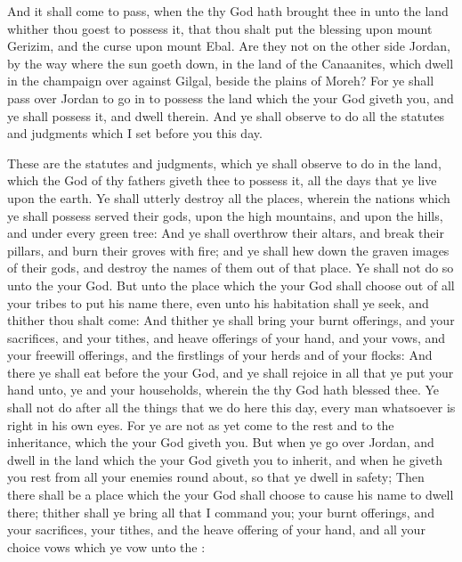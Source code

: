 \begin{biblechapter}
\verse And it shall come to pass, when the \LORD thy God hath brought thee in unto the land whither thou goest to possess it, that thou shalt put the blessing upon mount Gerizim, and the curse upon mount Ebal.
\verse Are they not on the other side Jordan, by the way where the sun goeth down, in the land of the Canaanites, which dwell in the champaign over against Gilgal, beside the plains of Moreh?
\verse For ye shall pass over Jordan to go in to possess the land which the \LORD your God giveth you, and ye shall possess it, and dwell therein.
\verse And ye shall observe to do all the statutes and judgments which I set before you this day.
\end{biblechapter}

\begin{biblechapter} %
 These are the statutes and judgments, which ye shall observe to do in the land, which the \LORD God of thy fathers giveth thee to possess it, all the days that ye live upon the earth.
\verse Ye shall utterly destroy all the places, wherein the nations which ye shall possess served their gods, upon the high mountains, and upon the hills, and under every green tree:
\verse And ye shall overthrow their altars, and break their pillars, and burn their groves with fire; and ye shall hew down the graven images of their gods, and destroy the names of them out of that place.
\verse Ye shall not do so unto the \LORD your God.
\verse But unto the place which the \LORD your God shall choose out of all your tribes to put his name there, even unto his habitation shall ye seek, and thither thou shalt come:
\verse And thither ye shall bring your burnt offerings, and your sacrifices, and your tithes, and heave offerings of your hand, and your vows, and your freewill offerings, and the firstlings of your herds and of your flocks:
\verse And there ye shall eat before the \LORD your God, and ye shall rejoice in all that ye put your hand unto, ye and your households, wherein the \LORD thy God hath blessed thee.
\verse Ye shall not do after all the things that we do here this day, every man whatsoever is right in his own eyes.
\verse For ye are not as yet come to the rest and to the inheritance, which the \LORD your God giveth you.
\verse But when ye go over Jordan, and dwell in the land which the \LORD your God giveth you to inherit, and when he giveth you rest from all your enemies round about, so that ye dwell in safety;
\verse Then there shall be a place which the \LORD your God shall choose to cause his name to dwell there; thither shall ye bring all that I command you; your burnt offerings, and your sacrifices, your tithes, and the heave offering of your hand, and all your choice vows which ye vow unto the \LORD:

\end{biblechapter}
